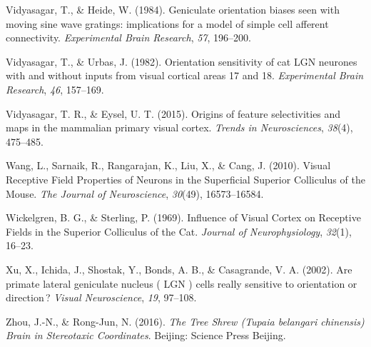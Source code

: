 Vidyasagar, T., \& Heide, W. (1984). Geniculate orientation biases seen
with moving sine wave gratings: implications for a model of simple cell
afferent connectivity. \emph{Experimental Brain Research}, \emph{57},
196--200.

Vidyasagar, T., \& Urbas, J. (1982). Orientation sensitivity of cat LGN
neurones with and without inputs from visual cortical areas 17 and 18.
\emph{Experimental Brain Research}, \emph{46}, 157--169.

Vidyasagar, T. R., \& Eysel, U. T. (2015). Origins of feature
selectivities and maps in the mammalian primary visual cortex.
\emph{Trends in Neurosciences}, \emph{38}(4), 475--485.

Wang, L., Sarnaik, R., Rangarajan, K., Liu, X., \& Cang, J. (2010).
Visual Receptive Field Properties of Neurons in the Superficial Superior
Colliculus of the Mouse. \emph{The Journal of Neuroscience},
\emph{30}(49), 16573--16584.

Wickelgren, B. G., \& Sterling, P. (1969). Influence of Visual Cortex on
Receptive Fields in the Superior Colliculus of the Cat. \emph{Journal of
Neurophysiology}, \emph{32}(1), 16--23.

Xu, X., Ichida, J., Shostak, Y., Bonds, A. B., \& Casagrande, V. A.
(2002). Are primate lateral geniculate nucleus ( LGN ) cells really
sensitive to orientation or direction\,? \emph{Visual Neuroscience},
\emph{19}, 97--108.

Zhou, J.-N., \& Rong-Jun, N. (2016). \emph{The Tree Shrew (Tupaia
belangari chinensis) Brain in Stereotaxic Coordinates}. Beijing: Science
Press Beijing.
